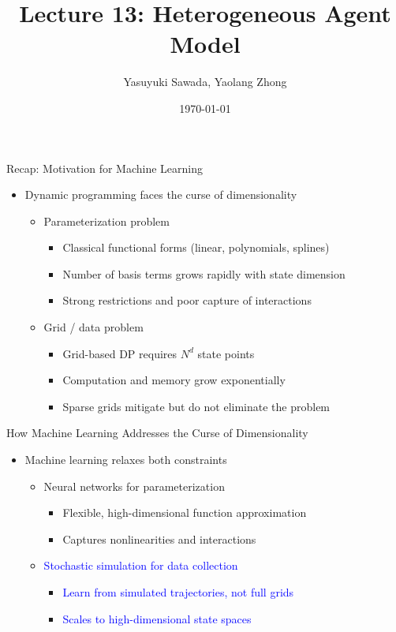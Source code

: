 \documentclass[aspectratio=169]{beamer}
\title{Lecture 13: Heterogeneous Agent Model}
\author{Yasuyuki Sawada, Yaolang Zhong}
\institute{University of Tokyo\\
  \small \texttt{\href{mailto:yaolang.zhong@e.u-tokyo.ac.jp}{yaolang.zhong@e.u-tokyo.ac.jp}}}
\date{\today}
\newcommand{\1}{\mathbf{1}}
\begin{document}
\begin{frame}
\titlepage  
\end{frame}



\begin{frame}{Recap: Motivation for Machine Learning}
  \begin{itemize}
      \item Dynamic programming faces the curse of dimensionality
      \begin{itemize}
          \item Parameterization problem
          \begin{itemize}
              \item Classical functional forms (linear, polynomials, splines)
              \item Number of basis terms grows rapidly with state dimension
              \item Strong restrictions and poor capture of interactions
          \end{itemize}
          \item Grid / data problem
          \begin{itemize}
              \item Grid-based DP requires $N^d$ state points
              \item Computation and memory grow exponentially
              \item Sparse grids mitigate but do not eliminate the problem
          \end{itemize}
      \end{itemize}
  \end{itemize}
  \end{frame}

  \begin{frame}{How Machine Learning Addresses the Curse of Dimensionality}
    \begin{itemize}
        \item Machine learning relaxes both constraints
        \begin{itemize}
            \item Neural networks for parameterization
            \begin{itemize}
                \item Flexible, high-dimensional function approximation
                \item Captures nonlinearities and interactions
            \end{itemize}
            \item \textcolor{blue}{Stochastic simulation for data collection}
            \begin{itemize}
                \item \textcolor{blue}{Learn from simulated trajectories, not full grids}
                \item \textcolor{blue}{Scales to high-dimensional state spaces}
            \end{itemize}
        \end{itemize}
    \end{itemize}
    \end{frame}
\end{document}

